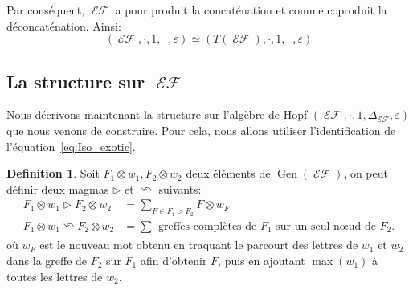 \documentclass[french]{article}
\theoremstyle{definition}
\newtheorem{defi}{Definition}[section]
\theoremstyle{plain}
\newcommand{\e}{\varepsilon}
\DeclareMathOperator{\Dsh}{{\Delta_{\shuffle}}}
\DeclareMathOperator{\EF}{\mathcal{EF}}
\DeclareMathOperator{\Gen}{Gen}
\begin{document}
Par conséquent, $\EF$ a pour produit la concaténation et comme coproduit la déconcaténation. Ainsi:
\begin{equation}\label{eq:Iso_exotic}
	(\EF,\cdot, 1, \Dsh,\e)\simeq (T(\EF),\cdot, 1, \Dsh,\e)
\end{equation}

\subsection{La structure \PH{} sur $\EF{}$}

Nous décrivons maintenant la structure \PH{} sur l'algèbre de Hopf $(\EF,\cdot, 1, \Delta_{\EF},\e)$ que nous venons de construire. Pour cela, nous allons utiliser l'identification de l'équation~\ref{eq:Iso_exotic}.


%
%


\begin{defi}
	Soit $F_1\otimes w_1, F_2\otimes w_2$ deux éléments de $\Gen(\EF)$, on peut définir deux magmas $\rhd$ et $\curvearrowleft$ suivants:
	\begin{align*}
		F_1\otimes w_1 \rhd F_2\otimes w_2 &= \sum_{F\in F_1\rhd F_2} F \otimes w_F \\
		F_1\otimes w_1 \curvearrowleft F_2\otimes w_2 &= \sum_{} \text{ greffes complètes de }F_1 \text{ sur un seul n\oe{}ud de } F_2.
	\end{align*}
	 où $w_F$ est le nouveau mot obtenu en traquant le parcourt des lettres de $w_1$ et $w_2$ dans la greffe de $F_2$ sur $F_1$ afin d'obtenir $F$, puis en ajoutant $\max(w_1)$ à toutes les lettres de $w_2$.
\end{defi}
\end{document}
